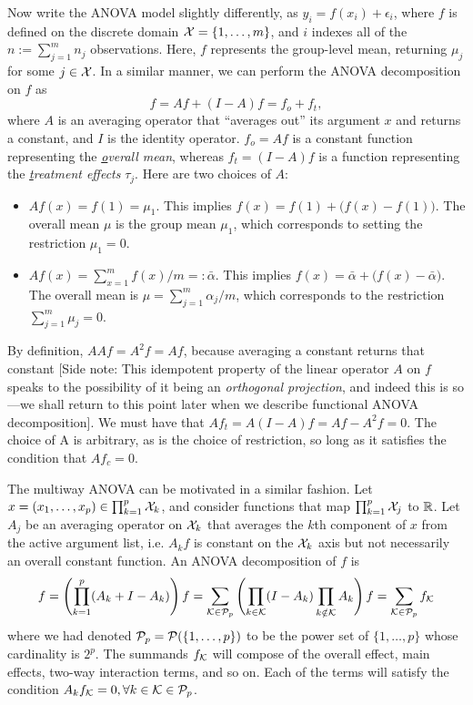Now write the ANOVA model slightly differently, as $y_{i} = f(x_i) + \epsilon_{i}$, where $f$ is defined on the discrete domain ${\mathcal X} = \{1,\dots,m\}$, and $i$ indexes all of the $n := \sum_{j=1}^m n_j$ observations.
Here, $f$ represents the group-level mean, returning $\mu_j$ for some $j\in{\mathcal X}$.
In a similar manner, we can perform the ANOVA decomposition on $f$ as
\[
  f = Af + (I-A)f = f_o + f_t,
\]
where $A$ is an averaging operator that ``averages out'' its argument $x$ and returns a constant, and $I$ is the identity operator.
$f_o = Af$ is a constant function representing the \textit{\underline{o}verall mean}, whereas $f_t = (I - A)f$ is a function representing the \textit{\underline{t}reatment effects} $\tau_j$.
Here are two choices of $A$:
\begin{itemize}
  \item $Af(x) = f(1) = \mu_1$. This implies $f(x) = f(1) + \big(f(x) - f(1)\big)$. The overall mean $\mu$ is the group mean $\mu_1$, which corresponds to setting the restriction $\mu_1=0$.
  \item $Af(x) = \sum_{x=1}^m f(x) / m =: \bar \alpha$. This implies $f(x) = \bar \alpha + \big( f(x) - \bar \alpha \big)$. The overall mean is $\mu = \sum_{j=1}^m \alpha_j/m$, which corresponds to the restriction $\sum_{j=1}^m \mu_j = 0$.
\end{itemize}
By definition, $AAf = A^2f = Af$, because averaging a constant returns that constant
[Side note: This idempotent property of the linear operator $A$ on $f$ speaks to the possibility of it being an \emph{orthogonal projection}, and indeed this is so---we shall return to this point later when we describe functional ANOVA decomposition].
We must have that $Af_t = A(I - A)f = Af - A^2f = 0$.
The choice of A is arbitrary, as is the choice of restriction, so long as it satisfies the condition that $Af_c = 0$.

The multiway ANOVA can be motivated in a similar fashion. 
Let $x = (x_1,\dots,x_p) \in \prod_{k=1}^p {\mathcal X}_k$, and consider functions that map $\prod_{k=1}^p {\mathcal X}_j$ to $\mathbb{R}$.
Let $A_j$ be an averaging operator on ${\mathcal X}_k$ that averages the $k$th component of $x$ from the active argument list, i.e. $A_kf$ is constant on the ${\mathcal X}_k$ axis but not necessarily an overall constant function.
An ANOVA decomposition of $f$ is
\[
  f = \left( \prod_{k=1}^p (A_k + I - A_k) \right)f = \sum_{{\mathcal K}\in{\mathcal P}_p} \left( \prod_{k\in{\mathcal K}} (I - A_k) \prod_{k\notin{\mathcal K}} A_k \right)f = \sum_{{\mathcal K}\in{\mathcal P}_p} f_{\mathcal K}
\]
where we had denoted ${\mathcal P}_p = {\mathcal P}(\{1,\dots,p\})$ to be the power set of $\{1,\dots,p\}$ whose cardinality is $2^p$.
The summands $f_{\mathcal K}$ will compose of the overall effect, main effects, two-way interaction terms, and so on.
Each of the terms will satisfy the condition $A_kf_{\mathcal K} = 0, \forall k \in {\mathcal K} \in {\mathcal P}_p$.

